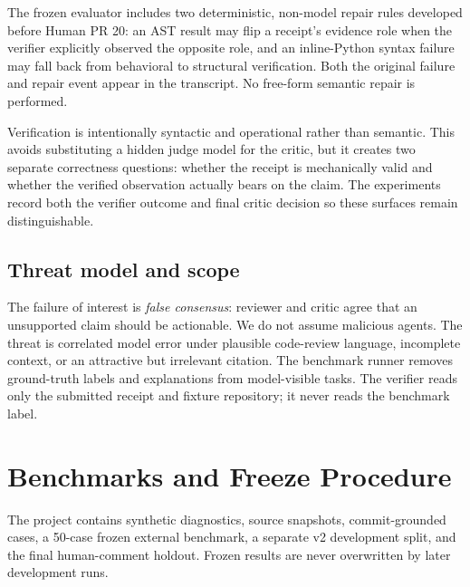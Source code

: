 \documentclass[acmsmall,screen,review,anonymous]{acmart}
\begin{document}
The frozen evaluator includes two deterministic, non-model repair rules developed before Human PR 20: an AST result may flip a receipt's evidence role when the verifier explicitly observed the opposite role, and an inline-Python syntax failure may fall back from behavioral to structural verification. Both the original failure and repair event appear in the transcript. No free-form semantic repair is performed.

Verification is intentionally syntactic and operational rather than semantic. This avoids substituting a hidden judge model for the critic, but it creates two separate correctness questions: whether the receipt is mechanically valid and whether the verified observation actually bears on the claim. The experiments record both the verifier outcome and final critic decision so these surfaces remain distinguishable.

\subsection{Threat model and scope}

The failure of interest is \emph{false consensus}: reviewer and critic agree that an unsupported claim should be actionable. We do not assume malicious agents. The threat is correlated model error under plausible code-review language, incomplete context, or an attractive but irrelevant citation. The benchmark runner removes ground-truth labels and explanations from model-visible tasks. The verifier reads only the submitted receipt and fixture repository; it never reads the benchmark label.

\section{Benchmarks and Freeze Procedure}

The project contains synthetic diagnostics, source snapshots, commit-grounded cases, a 50-case frozen external benchmark, a separate v2 development split, and the final human-comment holdout. Frozen results are never overwritten by later development runs.
\end{document}
